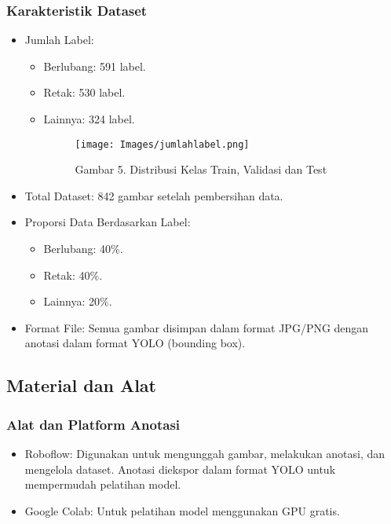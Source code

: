 \documentclass[12pt,a4paper]{article}
\begin{document}
\subsubsection{Karakteristik Dataset}
\begin{itemize}
    \item Jumlah Label:
    \begin{itemize}
        \item Berlubang: 591 label.
        \item Retak: 530 label.
        \item Lainnya: 324 label.
        \begin{figure}[h]
            \centering
            \texttt{[image: Images/jumlahlabel.png]}
            \caption*{Gambar 5. Distribusi Kelas Train, Validasi dan Test}
            \label{fig:enter-label}
        \end{figure}
    \end{itemize}
    \item Total Dataset: 842 gambar setelah pembersihan data.
    \item Proporsi Data Berdasarkan Label:
    \begin{itemize}
        \item Berlubang: 40\%.
        \item Retak: 40\%.
        \item Lainnya: 20\%.
    \end{itemize}
    \item Format File: Semua gambar disimpan dalam format JPG/PNG dengan anotasi dalam format YOLO (bounding box).
\end{itemize}

\subsection{Material dan Alat}

\subsubsection{Alat dan Platform Anotasi}
\begin{itemize}
    \item Roboflow: Digunakan untuk mengunggah gambar, melakukan anotasi, dan mengelola dataset. Anotasi diekspor dalam format YOLO untuk mempermudah pelatihan model.
    \item Google Colab: Untuk pelatihan model menggunakan GPU gratis.
\end{itemize}
\end{document}
